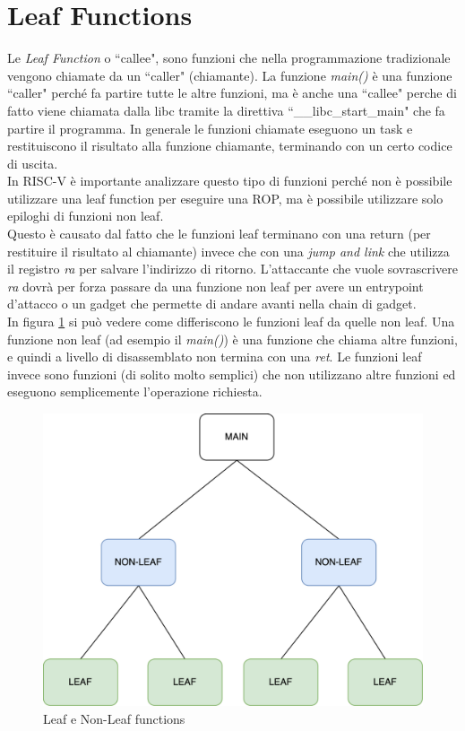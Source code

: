 \section*{Leaf Functions}
Le \textit{Leaf Function} o ``callee", sono funzioni che nella programmazione tradizionale vengono chiamate da un ``caller" (chiamante). La funzione \textit{main()} è una funzione ``caller" perché fa partire tutte le altre funzioni, ma è anche una ``callee" perche di fatto viene chiamata dalla libc tramite la direttiva ``\_\_libc\_start\_main" che fa partire il programma. In generale le funzioni chiamate eseguono un task e restituiscono il risultato alla funzione chiamante, terminando con un certo codice di uscita.\\
\newline
In RISC-V è importante analizzare questo tipo di funzioni perché non è possibile utilizzare una leaf function per eseguire una ROP, ma è possibile utilizzare solo epiloghi di funzioni non leaf.\\
Questo è causato dal fatto che le funzioni leaf terminano con una return (per restituire il risultato al chiamante) invece che con una \textit{jump and link} che utilizza il registro \textit{ra} per salvare l'indirizzo di ritorno. L'attaccante che vuole sovrascrivere \textit{ra} dovrà per forza passare da una funzione non leaf per avere un entrypoint d'attacco o un gadget che permette di andare avanti nella chain di gadget.\\
In figura \ref{ref:leaf-non-leaf} si può vedere come differiscono le funzioni leaf da quelle non leaf. Una funzione non leaf (ad esempio il \textit{main()}) è una funzione che chiama altre funzioni, e quindi a livello di disassemblato non termina con una \textit{ret}. Le funzioni leaf invece sono funzioni (di solito molto semplici) che non utilizzano altre funzioni ed eseguono semplicemente l'operazione richiesta.
\vspace{1cm}
\FloatBarrier
\begin{figure}[!htbp]
    \centering
    \includegraphics[width=0.6\linewidth]{images/leaf-functions.png}
    \caption{Leaf e Non-Leaf functions}
    \label{ref:leaf-non-leaf}
\end{figure}
